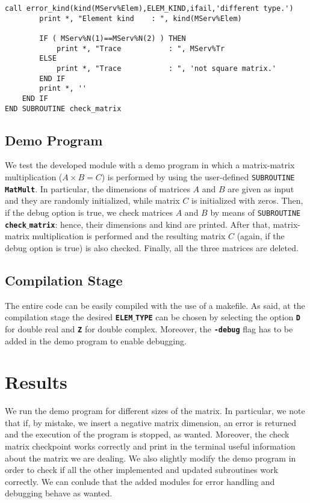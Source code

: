 \documentclass[rmp,10pt,onecolumn,fleqn,notitlepage]{revtex4-1}
\begin{document}
\begin{itemize}
\begin{minipage}[t]{0.76\linewidth}
\begin{lstlisting}[style=Fortran]
        call error_kind(kind(MServ%Elem),ELEM_KIND,ifail,'different type.')
        print *, "Element kind    : ", kind(MServ%Elem)

        IF ( MServ%N(1)==MServ%N(2) ) THEN
            print *, "Trace           : ", MServ%Tr
        ELSE
            print *, "Trace           : ", 'not square matrix.'
        END IF
        print *, ''
    END IF
END SUBROUTINE check_matrix\end{lstlisting}
    \end{minipage}

\end{itemize}

\subsection{Demo Program}
We test the developed module with a demo program in which a matrix-matrix multiplication (\( A \times
B = C \)) is performed by using the user-defined \texttt{SUBROUTINE} {\bfseries\texttt{MatMult}}. In particular, the dimensions of matrices \( A \) and \( B \) are given as input and they are randomly initialized, while matrix \( C \) is initialized with zeros. Then, if the debug option is true, we check matrices \( A \) and \( B \) by means of \texttt{SUBROUTINE} {\bfseries\texttt{check$\_$matrix}}: hence, their dimensions and kind are printed. After that, matrix-matrix multiplication is performed and the resulting matrix \( C \) (again, if the debug option is true) is also checked. Finally, all the three matrices are deleted.


\subsection{Compilation Stage}
The entire code can be easily compiled with the use of a makefile. As said, at the compilation stage the desired {\bfseries\texttt{ELEM}$\_$\texttt{TYPE}} can be chosen by selecting the option {\bfseries\texttt{D}} for double real and {\bfseries\texttt{Z}} for double complex. Moreover, the {\bfseries\texttt{-debug}} flag has to be added in the demo program to enable debugging.





\section{Results}
We run the demo program for different sizes of the matrix. In particular, we note that if, by mistake, we insert a negative matrix dimension, an error is returned and the execution of the program is stopped, as wanted. Moreover, the check matrix checkpoint works correctly and print in the terminal useful information about the matrix we are dealing.
We also slightly modify the demo program in order to check if all the other implemented and updated subroutines work correctly. We can conlude that the added modules for error handling and debugging behave as wanted.
\end{document}
